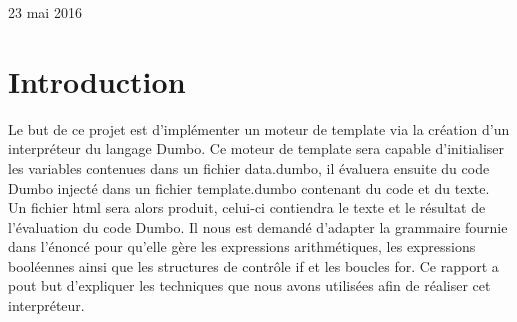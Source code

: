 \documentclass[a4paper,10pt]{article}
\begin{document}
\begin{titlepage}

{\large 23 mai 2016}\\[3cm] %


 

\vfill %

\end{titlepage}

\newpage
\tableofcontents
\newpage

\section{Introduction}

Le but de ce projet est d'implémenter un moteur de template via la création d'un interpréteur du langage \textrm{Dumbo}. Ce moteur de template sera capable d'initialiser les 
variables contenues dans un fichier \textrm{data.dumbo}, il évaluera ensuite du code Dumbo injecté dans un fichier \textrm{template.dumbo} contenant du code et du texte. Un fichier
html sera alors produit, celui-ci contiendra le texte et le résultat de l'évaluation du code Dumbo. Il nous est demandé d'adapter la grammaire fournie dans l'énoncé pour 
qu'elle gère les expressions arithmétiques, les expressions booléennes ainsi que les structures de contrôle \textrm{if} et les boucles \textrm{for}.
Ce rapport a pout but d'expliquer les techniques que nous avons utilisées afin de réaliser cet interpréteur.
\end{document}
